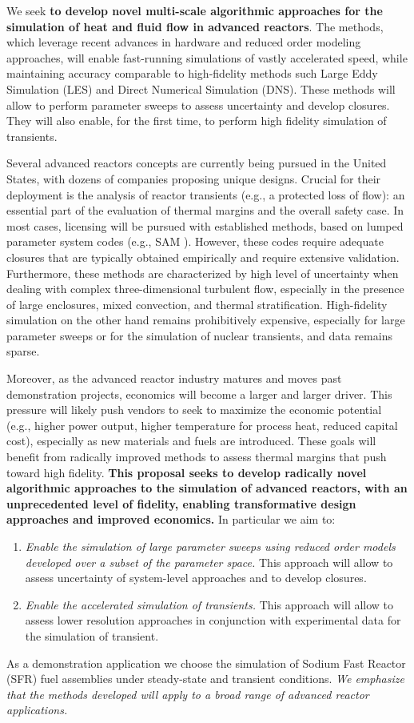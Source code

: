 We seek \textbf{to develop novel multi-scale algorithmic approaches for the
simulation of heat and fluid flow in advanced reactors}. The methods, which
leverage recent advances in hardware and reduced order modeling approaches,
will enable fast-running simulations of vastly accelerated speed, while
maintaining accuracy comparable to high-fidelity methods such Large Eddy
Simulation (LES) and Direct Numerical Simulation (DNS). These methods will
allow to perform
parameter sweeps to assess uncertainty and develop closures. They will also
enable, for the first time, to perform high fidelity simulation of transients.

Several  advanced reactors concepts are currently being pursued in the United
States, with dozens of companies proposing unique designs. Crucial for their
deployment is the analysis of  reactor transients (e.g., a protected loss of
flow): an essential part of the evaluation of thermal margins and the overall
safety case.  In most cases, licensing will be pursued with established
methods, based on lumped parameter system codes (e.g., SAM \cite{hu2021}).
However, these codes require adequate closures that are typically obtained
empirically and require extensive validation. Furthermore, these methods are
characterized by high level of uncertainty when dealing with complex
three-dimensional turbulent flow, especially in the presence of large
enclosures, mixed convection, and thermal stratification. High-fidelity
simulation on the other hand remains prohibitively expensive, especially for
large parameter sweeps or for the simulation of nuclear transients, and data
remains sparse.

Moreover, as the advanced reactor industry matures and moves past demonstration
projects, economics will become a larger and larger driver. This pressure will
likely push vendors to seek to maximize the economic potential (e.g., higher
power output, higher temperature for process heat, reduced capital cost),
especially as new materials and fuels are introduced. These goals will benefit
from radically improved methods to assess thermal margins that push toward high
fidelity. \textbf{This proposal seeks to develop radically novel algorithmic
approaches to the simulation of advanced reactors, with an unprecedented level
of fidelity, enabling transformative design approaches and improved economics.}
In particular we aim to: 
\begin{enumerate}
%
   \item \textit{Enable the simulation of large parameter sweeps using reduced
   order models developed over a subset of the parameter space.} This approach
   will allow to assess uncertainty of system-level approaches and to develop
   closures.
%
   \item \textit{Enable the accelerated simulation of transients.}
   This approach will allow to assess lower resolution approaches in conjunction
   with experimental data for the simulation of transient.  
\end{enumerate}
As a demonstration application we choose the simulation of Sodium Fast Reactor
(SFR) fuel assemblies under steady-state and transient conditions. \textit{We
emphasize that the methods developed will apply to a broad range of advanced
reactor applications.}

